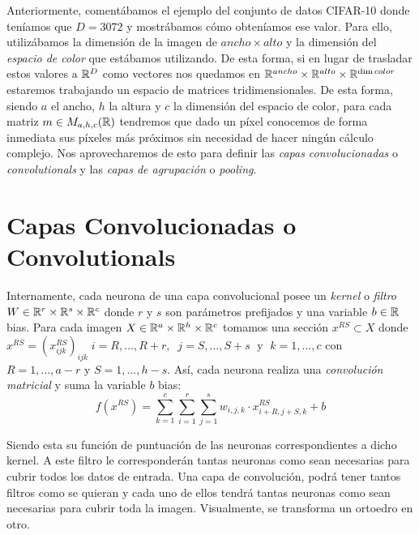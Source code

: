 Anteriormente, comentábamos el ejemplo del conjunto de datos CIFAR-10 donde teníamos que $D=3072$ y mostrábamos cómo obteníamos ese valor. Para ello, utilizábamos la dimensión de la imagen de $ancho \times alto $ y la dimensión del \emph{espacio de color} que estábamos utilizando. De esta forma, si en lugar de trasladar estos valores a $\mathbb{R}^D$ como vectores nos quedamos en $\mathbb{R}^{ancho}\times \mathbb{R}^{alto} \times \mathbb{R}^{\dim color}$ estaremos trabajando un espacio de matrices tridimensionales. De esta forma, siendo $a$ el ancho, $h$ la altura y $c$ la dimensión del espacio de color, para cada matriz $m \in M_{a, h,c}(\mathbb{R})$ tendremos que dado un píxel conocemos de forma inmediata sus píxeles más próximos sin necesidad de hacer ningún cálculo complejo. Nos aprovecharemos de esto para definir las \emph{capas convolucionadas} o \emph{convolutionals} y las \emph{capas de agrupación} o \emph{pooling}.\\

\section{Capas Convolucionadas o Convolutionals}

Internamente, cada neurona de una capa convolucional posee un \emph{kernel} o \emph{filtro} $W\in \mathbb{R}^r \times \mathbb{R}^s \times \mathbb{R}^c$ donde $r$ y $s$ son parámetros prefijados y una variable $b\in\mathbb{R}$ bias. Para cada imagen $X \in \mathbb{R}^a \times \mathbb{R}^h \times \mathbb{R}^c$ tomamos una sección $x^{RS} \subset X$ donde $x^{RS}=(x_{ijk}^{RS})_{ijk}\; i=R,...,R+r, \;\; j=S,...,S+s\;$ y $\;k=1,...,c$ con $R=1,...,a-r$ y $S=1,...,h-s$. Así, cada neurona realiza una \emph{convolución matricial} y suma la variable $b$ bias: \\

$$f(x^{RS})=\sum_{k=1}^{c}\sum_{i=1}^{r} \sum_{j=1}^{s} w_{i,j,k} \cdot x_{i+R,j+S,k}^{RS}+b$$

Siendo esta su función de puntuación de las neuronas correspondientes a dicho kernel. A este filtro le corresponderán tantas neuronas como sean necesarias para cubrir todos los datos de entrada. Una capa de convolución, podrá tener tantos filtros como se quieran y cada uno de ellos tendrá tantas neuronas como sean necesarias para cubrir toda la imagen. Visualmente, se transforma un ortoedro en otro.\\

